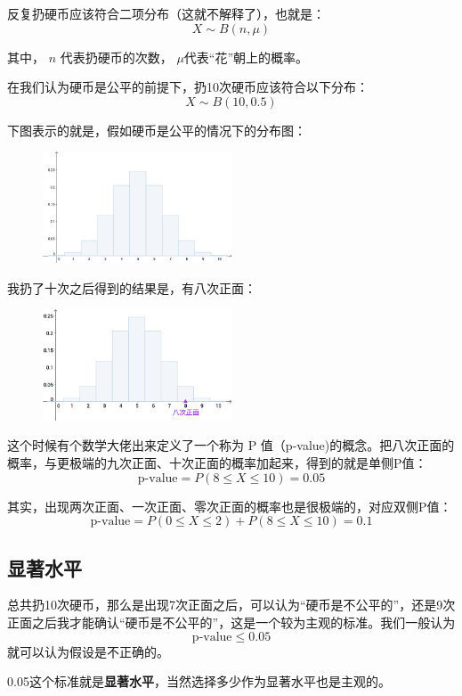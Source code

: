 \documentclass[12pt]{article}
\begin{document}
反复扔硬币应该符合二项分布（这就不解释了），也就是：
$$
X \sim B(n, \mu)
$$

其中， $n$ 代表扔硬币的次数， $\mu$代表“花”朝上的概率。

在我们认为硬币是公平的前提下，扔10次硬币应该符合以下分布：
$$
X \sim B(10, 0.5)
$$

下图表示的就是，假如硬币是公平的情况下的分布图：
\begin{figure}[H]
    \centering
    \includegraphics[width=0.5\textwidth]{fig/P_Value_Example_1.png}
\end{figure}
我扔了十次之后得到的结果是，有八次正面：
\begin{figure}[H]
    \centering
    \includegraphics[width=0.5\textwidth]{fig/P_Value_Example_2.png}
\end{figure}

这个时候有个数学大佬出来定义了一个称为 P 值（p-value)的概念。把八次正面的概率，与更极端的九次正面、十次正面的概率加起来，得到的就是单侧P值：
$$
\text{p-value} = P(8 \le X \le 10) = 0.05
$$

其实，出现两次正面、一次正面、零次正面的概率也是很极端的，对应双侧P值：
$$
\text{p-value} = P(0 \le X \le 2)  +  P(8 \le X \le 10) = 0.1
$$

\subsection{显著水平}
总共扔10次硬币，那么是出现7次正面之后，可以认为“硬币是不公平的”，还是9次正面之后我才能确认“硬币是不公平的”，这是一个较为主观的标准。我们一般认为
$$
\text{p-value} \le 0.05
$$
就可以认为假设是不正确的。

0.05这个标准就是\textbf{显著水平}，当然选择多少作为显著水平也是主观的。
\end{document}
